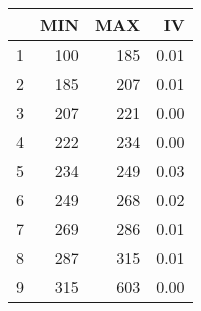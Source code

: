 \begin{table}[ht]
\centering
\begin{tabular}{rrrr}
  \hline
 & MIN & MAX & IV \\ 
  \hline
1 & 100 & 185 & 0.01 \\ 
  2 & 185 & 207 & 0.01 \\ 
  3 & 207 & 221 & 0.00 \\ 
  4 & 222 & 234 & 0.00 \\ 
  5 & 234 & 249 & 0.03 \\ 
  6 & 249 & 268 & 0.02 \\ 
  7 & 269 & 286 & 0.01 \\ 
  8 & 287 & 315 & 0.01 \\ 
  9 & 315 & 603 & 0.00 \\ 
   \hline
\end{tabular}
\end{table}
